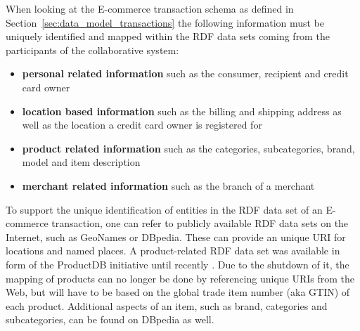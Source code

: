 
When looking at the \gls{E-commerce} transaction schema as defined in Section~\ref{sec:data_model_transactions} the following information must be uniquely identified and mapped within the \gls{RDF} data sets coming from the participants of the collaborative system: \@

\begin{itemize}
	\item \textbf{personal related information} such as the consumer, recipient and credit card owner
	\item \textbf{location based information} such as the billing and shipping address as well as the location a credit card owner is registered for
	\item \textbf{product related information} such as the categories, subcategories, brand, model and item description
	\item \textbf{merchant related information} such as the branch of a merchant
\end{itemize}

To support the unique identification of entities in the \gls{RDF} data set of an \gls{E-commerce} transaction, one can refer to publicly available \gls{RDF} data sets on the Internet, such as GeoNames or DBpedia. These can provide an unique \gls{URI} for locations and named places. A product-related \gls{RDF} data set was available in form of the ProductDB initiative until recently \citep{bouzidi2014product}. Due to the shutdown of it, the mapping of products can no longer be done by referencing unique \gls{URI}s from the Web, but will have to be based on the global trade item number (aka \gls{GTIN}) of each product. Additional aspects of an item, such as brand, categories and subcategories, can be found on DBpedia as well. \\

